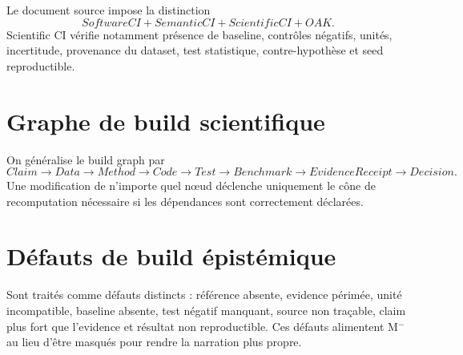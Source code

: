 Le document source impose la distinction
\[
SoftwareCI+SemanticCI+ScientificCI+OAK.
\]
Scientific CI vérifie notamment présence de baseline, contrôles négatifs, unités, incertitude, provenance du dataset, test statistique, contre-hypothèse et seed reproductible.

\section{Graphe de build scientifique}

On généralise le build graph par
\[
Claim\rightarrow Data\rightarrow Method\rightarrow Code\rightarrow Test\rightarrow Benchmark\rightarrow EvidenceReceipt\rightarrow Decision.
\]
Une modification de n'importe quel nœud déclenche uniquement le cône de recomputation nécessaire si les dépendances sont correctement déclarées.

\section{Défauts de build épistémique}

Sont traités comme défauts distincts : référence absente, evidence périmée, unité incompatible, baseline absente, test négatif manquant, source non traçable, claim plus fort que l'evidence et résultat non reproductible. Ces défauts alimentent M$^-$ au lieu d'être masqués pour rendre la narration plus propre.
